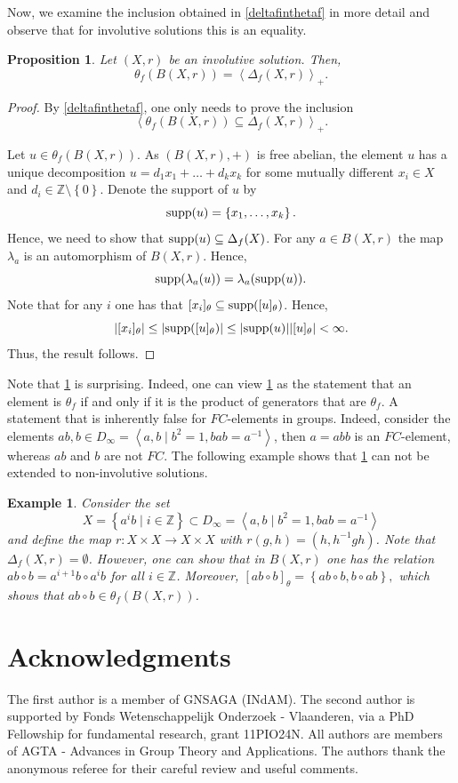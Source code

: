 \documentclass{amsart}
\newtheorem{pro}[thm]{Proposition}
\newtheorem{exa}[thm]{Example}
\begin{document}
Now, we examine the inclusion obtained in \cref{deltafinthetaf} in more detail and observe that for involutive solutions this is an equality.
\begin{pro}\label{involuttheta}
    Let $(X,r)$ be an involutive solution. Then, $$ \theta_f(B(X,r)) = \left< \Delta_f(X,r)\right>_+.$$
\end{pro}
\begin{proof}
    By \cref{deltafinthetaf}, one only needs to prove the inclusion $$\left< \theta_f(B(X,r)) \subseteq \Delta_f(X,r)\right>_+ .  $$ 

    Let $u \in \theta_f(B(X,r))$. As $(B(X,r),+)$ is free abelian, the element $u$ has a unique decomposition $u=d_1x_1+\dots+d_kx_k$ for some mutually different $x_i \in X$ and $d_i \in \mathbb{Z}\setminus\left\lbrace 0 \right\rbrace.$ Denote the support of $u$ by $$ \textup{supp}(u)=\left\lbrace x_1,\dots ,x_k\right\rbrace.$$
    Hence, we need to show that $\textup{supp}(u)\subseteq \Delta_f(X)$. For any $a \in B(X,r)$ the map $\lambda_a$ is an automorphism of $B(X,r)$. Hence, $$ \textup{supp}(\lambda_a(u)) = \lambda_a(\textup{supp}(u)).$$
    Note that for any $i$ one has that $[x_i]_{\theta} \subseteq \textup{supp}([u]_{\theta})$. Hence, $$ |[x_i]_{\theta}|\leq |\textup{supp}( [u]_{\theta})| \leq |\textup{supp}(u)| |[u]_{\theta}| <\infty.$$ Thus, the result follows.
\end{proof}

Note that \cref{involuttheta} is surprising. Indeed, one can view \cref{involuttheta} as the statement that an element is $\theta_f$ if and only if it is the product of generators that are $\theta_f$. A statement that is inherently false for $FC$-elements in groups. Indeed, consider the elements $ab,b \in D_{\infty} =\left< a,b \mid b^2=1, bab=a^{-1}\right>$, then $a=ab b$ is an $FC$-element, whereas $ab$ and $b$ are not $FC$. The following example shows that \cref{involuttheta} can not be extended to non-involutive solutions.
\begin{exa}
    Consider the set $$X = \left\lbrace a^ib \mid i \in \mathbb{Z}\right\rbrace \subset D_{\infty}=\left<a,b \mid b^2=1,bab=a^{-1}\right>$$ and define the map $r\colon X \times X \rightarrow X \times X$ with $r(g,h)=(h,h^{-1}gh)$. Note that $\Delta_f(X,r)=\emptyset$. However, one can show that in $B(X,r)$ one has the relation $ab \circ b = a^{i+1}b \circ a^ib$ for all $i \in \mathbb{Z}$. Moreover, $[ab\circ b]_{\theta}= \left\lbrace ab \circ b,b \circ ab\right\rbrace, $ which shows that $ab \circ b \in \theta_f(B(X,r))$.
\end{exa}

\section*{Acknowledgments}
The first author is a member of GNSAGA (INdAM).
The second author is supported by Fonds Wetenschappelijk Onderzoek - Vlaanderen, via a PhD Fellowship for fundamental research, grant 11PIO24N. 
All authors are members of AGTA - Advances in Group Theory and Applications. The authors thank the anonymous referee for their careful review and useful comments.



\end{document}
